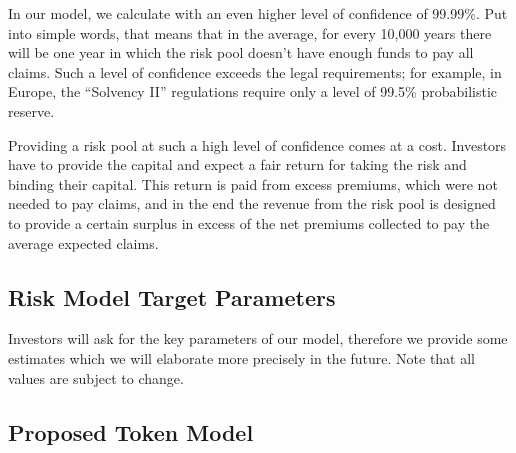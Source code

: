 \documentclass[12pt]{article}
\begin{document}
In our model, we calculate with an even higher level of confidence of 99.99\%. Put into simple words, that means that in the average, for every 10,000 years there will be one year in which the risk pool doesn’t have enough funds to pay all claims. Such a level of confidence exceeds the legal requirements; for example, in Europe, the ``Solvency II'' regulations require only a level of 99.5\% probabilistic reserve. 

Providing a risk pool at such a high level of confidence comes at a cost. Investors have to provide the capital and expect a fair return for taking the risk and binding their capital. This return is paid from excess premiums, which were not needed to pay claims, and in the end the revenue from the risk pool is designed to provide a certain surplus in excess of the net premiums collected to pay the average expected claims. 

\subsection{Risk Model Target Parameters}

Investors will ask for the key parameters of our model, therefore we provide some estimates which we will elaborate more precisely in the future. Note that all values are subject to change.
\vspace{10mm}
\begin{center}
\begin{calstable}
\colwidths{{7cm}{7cm}}
\large
\brow 
\erow
\normalsize
\brow 
\erow
\brow 
\erow
\brow 
\erow

\brow 
\erow

\brow 
\erow
\end{calstable}
\end{center}



\subsection{Proposed Token Model}
\end{document}
